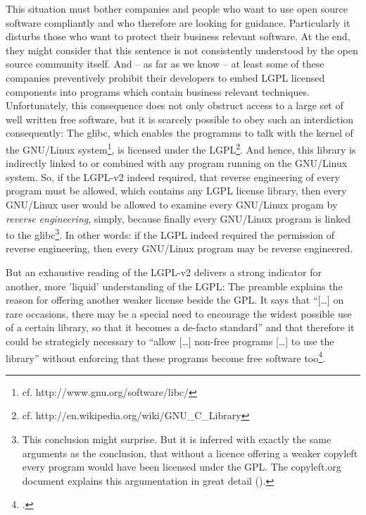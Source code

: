 This situation must bother companies and people who want to use open source
software compliantly and who therefore are looking for guidance. Particularly it
disturbs those who want to protect their business relevant software. At the end,
they might consider that this sentence is not consistently understood by the
open source community itself. And -- as far as we know -- at least some of these
companies preventively prohibit their developers to embed LGPL licensed
components into programs which contain business relevant techniques.
Unfortunately, this consequence does not only obstruct access to a large set of
well written free software, but it is scarcely possible to obey such an
interdiction consequently: The glibc, which enables the programms to talk with
the kernel of the GNU/Linux system\footnote{cf.
http://www.gnu.org/software/libc/}, is licensed under the LGPL\footnote{cf.
http://en.wikipedia.org/wiki/GNU\_C\_Library}. And hence, this library is
indirectly linked to or combined with any program running on the GNU/Linux
system. So, if the LGPL-v2 indeed required, that reverse engineering of every
program must be allowed, which contains any LGPL license library, then every
GNU/Linux user would be allowed to examine every GNU/Linux progam by
\emph{reverse engineering}, simply, because finally every GNU/Linux program is
linked to the glibc\footnote{This conclusion might surprise. But it is inferred
with exactly the same arguments as the conclusion, that without a licence
offering a weaker copyleft every program would have been licensed under the GPL.
The copyleft.org document explains this argumentation in great detail
(\cite[cf.][56f]{KuhSebGin2014a}).}. In other words: if the LGPL indeed required
the permission of reverse engineering, then every GNU/Linux program may be
reverse engineered.

But an exhaustive reading of the LGPL-v2 delivers a strong indicator for
another, more 'liquid' understanding of the LGPL: The preamble explains the
reason for offering another weaker license beside the GPL. It says that
\enquote{[\ldots] on rare occasions, there may be a special need to encourage
the widest possible use of a certain library, so that it becomes a de-facto
standard} and that therefore it could be strategicly necessary to \enquote{allow
[\ldots] non-free programs [\ldots] to use the library} without enforcing that
these programs become free software too\footcite[cf.][\nopage wp,
§preamble]{Lgpl21OsiLicense1999a}.

